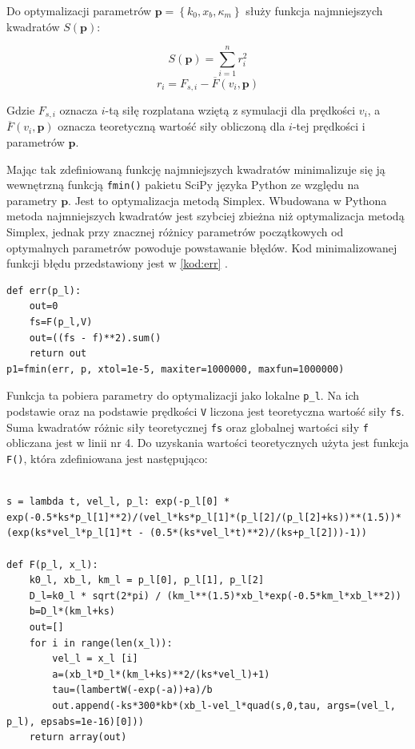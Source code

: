 Do optymalizacji parametrów $\mathbf{p}=\left\lbrace k_0, x_b, \kappa_m\right\rbrace$ służy funkcja najmniejszych kwadratów $S(\mathbf{p})$:

\[
S(\mathbf{p})=\sum_{i=1}^n r_i^2 
\]
\[
r_i=F_{s, i} - \overline{F}(v_i, \mathbf{p})
\]

Gdzie $F_{s,i}$ oznacza $i$-tą siłę rozplatana wziętą z symulacji dla prędkości $v_i$, a $\overline{F}(v_i, \mathbf{p})$ oznacza teoretyczną wartość siły obliczoną dla $i$-tej prędkości i parametrów $\mathbf{p}$.

Mając tak zdefiniowaną funkcję najmniejszych kwadratów minimalizuje się ją wewnętrzną funkcją \texttt{fmin()} pakietu SciPy \cite{Scipy} języka Python ze względu na parametry $\mathbf{p}$. Jest to optymalizacja metodą Simplex. Wbudowana w Pythona metoda najmniejszych kwadratów jest szybciej zbieżna niż optymalizacja metodą Simplex, jednak przy znacznej różnicy parametrów początkowych od optymalnych parametrów powoduje powstawanie błędów. Kod minimalizowanej funkcji błędu przedstawiony jest w \ref{kod:err} .
\begin{lstlisting}[label={kod:err}, caption={Minimalizowana funkcja błędu.}]
def err(p_l):
	out=0
	fs=F(p_l,V)
	out=((fs - f)**2).sum()
	return out
p1=fmin(err, p, xtol=1e-5, maxiter=1000000, maxfun=1000000)
\end{lstlisting}

Funkcja ta pobiera parametry do optymalizacji jako lokalne \texttt{p\_l}. Na ich podstawie oraz na podstawie prędkości \texttt{V} liczona jest teoretyczna wartość siły \texttt{fs}. Suma kwadratów różnic siły teoretycznej \texttt{fs} oraz globalnej wartości siły \texttt{f} obliczana jest w linii nr 4. Do uzyskania wartości teoretycznych użyta jest funkcja \texttt{F()}, która zdefiniowana jest następująco:

\begin{lstlisting}[label={kod:F}, caption={Znajdowanie wartości funkcji teoretycznej dla zadanych parametrów i prędkości.}]

s = lambda t, vel_l, p_l: exp(-p_l[0] * exp(-0.5*ks*p_l[1]**2)/(vel_l*ks*p_l[1]*(p_l[2]/(p_l[2]+ks))**(1.5))*(exp(ks*vel_l*p_l[1]*t - (0.5*(ks*vel_l*t)**2)/(ks+p_l[2]))-1))

def F(p_l, x_l):
	k0_l, xb_l, km_l = p_l[0], p_l[1], p_l[2]
	D_l=k0_l * sqrt(2*pi) / (km_l**(1.5)*xb_l*exp(-0.5*km_l*xb_l**2))
	b=D_l*(km_l+ks)
	out=[]
	for i in range(len(x_l)):
		vel_l = x_l [i]
		a=(xb_l*D_l*(km_l+ks)**2/(ks*vel_l)+1)
		tau=(lambertW(-exp(-a))+a)/b
		out.append(-ks*300*kb*(xb_l-vel_l*quad(s,0,tau, args=(vel_l, p_l), epsabs=1e-16)[0]))
	return array(out)
\end{lstlisting}

